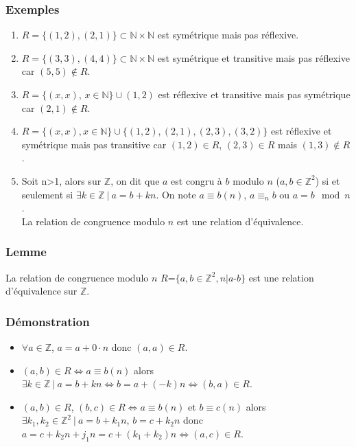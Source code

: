 \documentclass[a4paper,10pt]{book} %
\newcommand{\N}{\mathbb{N}}
\newcommand{\Z}{\mathbb{Z}}
\newcommand{\tq}{~|~}
\begin{document}
\subsubsection{Exemples}
\begin{enumerate}
\item $R=\{(1,2),(2,1)\}\subset \N\times \N$ est symétrique mais pas réflexive.

\item $R=\{(3,3),(4,4)\}\subset\N\times\N$ est symétrique et transitive mais pas réflexive car $(5,5)\notin R$.

\item $R=\{(x,x)$, $x\in \N\}\cup (1,2)$ est réflexive et transitive mais pas symétrique car $(2,1)\notin R$.

\item $R=\{(x,x), x\in \N\}\cup\{(1,2),(2,1),(2,3),(3,2)\}$ est réflexive et symétrique mais pas transitive car $(1,2)\in R$, $(2,3)\in R$ mais $(1,3)\notin R$.

\item Soit n>1, alors sur $\Z$, on dit que $a$ est congru à $b$ modulo $n$ ($a,b\in \Z^2$) si et seulement si $\exists k\in \Z \tq a=b+kn$. On note $a\equiv b(n)$, $a\equiv_n b$ ou $a=b\mod{n}$.\\
La relation de congruence modulo $n$ est une relation d'équivalence.
\end{enumerate}

\subsubsection{Lemme}
La relation de congruence modulo $n$ $R\text{=}\{a,b\in \Z^2, n|a\text{-}b\}$ est une relation d'équivalence sur $\Z$.

\subsubsection{Démonstration}
\begin{itemize}[label=$\cdot$]
\item $\forall a\in \Z$, $a=a+0\cdot n$ donc $(a,a)\in R$.
\item $(a,b)\in R \Leftrightarrow a\equiv b(n)$ alors $\exists k\in \Z \tq a=b+kn \Leftrightarrow b=a+(-k)n \Leftrightarrow (b,a)\in R$.
\item $(a,b)\in R$, $(b,c)\in R \Leftrightarrow a\equiv b(n)$ et $b\equiv c(n)$ alors $\exists k_1,k_2\in \Z^2 \tq a=b+k_1n$, $b=c+k_2n$ donc $a=c+k_2n+j_1n=c+(k_1+k_2)n \Leftrightarrow (a,c)\in R$.
\end{itemize}
\end{document}

